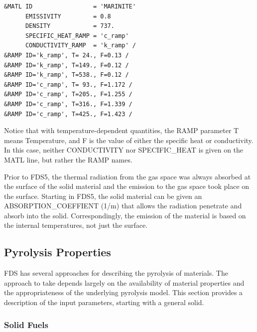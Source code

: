 \documentclass[11pt]{book}
\begin{document}
\footnotesize
\begin{verbatim}
&MATL ID                 = 'MARINITE'
      EMISSIVITY         = 0.8
      DENSITY            = 737.
      SPECIFIC_HEAT_RAMP = 'c_ramp'
      CONDUCTIVITY_RAMP  = 'k_ramp' /
&RAMP ID='k_ramp', T= 24., F=0.13 /
&RAMP ID='k_ramp', T=149., F=0.12 /
&RAMP ID='k_ramp', T=538., F=0.12 /
&RAMP ID='c_ramp', T= 93., F=1.172 /
&RAMP ID='c_ramp', T=205., F=1.255 /
&RAMP ID='c_ramp', T=316., F=1.339 /
&RAMP ID='c_ramp', T=425., F=1.423 /
\end{verbatim}
\normalsize
Notice that with temperature-dependent quantities, the {\ct RAMP} parameter
{\ct T} means Temperature, and {\ct F} is the value of either
the specific heat or conductivity. In this case, neither {\ct CONDUCTIVITY} nor {\ct SPECIFIC\_HEAT} is given on the
{\ct MATL} line, but rather the {\ct RAMP} names.

Prior to FDS5, the thermal radiation from the gas space was always
absorbed at the surface of the solid material and the emission to the
gas space took place on the surface. Starting in FDS5, the solid
material can be given an {\ct ABSORPTION\_COEFFIENT} (1/m) that allows
the radiation penetrate and absorb into the solid. Correspondingly,
the emission of the material is based on the internal temperatures,
not just the surface.

\subsection{Pyrolysis Properties}

FDS has several approaches for describing the pyrolysis of materials. The approach to take depends largely
on the availability of material properties and the appropriateness of the underlying pyrolysis model. This
section provides a description of the input parameters, starting with a general solid.

\subsubsection{Solid Fuels}
\end{document}
